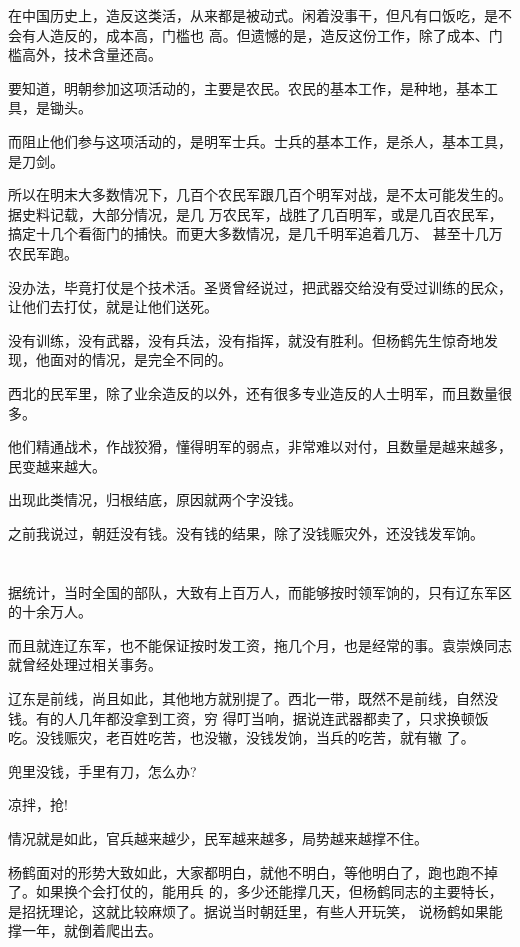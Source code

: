 \documentclass[11pt,a4paper,onecolumn]{article}
\begin{document}
在中国历史上，造反这类活，从来都是被动式。闲着没事干，但凡有口饭吃，是不会有人造反的，成本高，门槛也
高。但遗憾的是，造反这份工作，除了成本、门槛高外，技术含量还高。

要知道，明朝参加这项活动的，主要是农民。农民的基本工作，是种地，基本工具，是锄头。

而阻止他们参与这项活动的，是明军士兵。士兵的基本工作，是杀人，基本工具，是刀剑。

所以在明末大多数情况下，几百个农民军跟几百个明军对战，是不太可能发生的。据史料记载，大部分情况，是几
万农民军，战胜了几百明军，或是几百农民军，搞定十几个看衙门的捕快。而更大多数情况，是几千明军追着几万、
甚至十几万农民军跑。

没办法，毕竟打仗是个技术活。圣贤曾经说过，把武器交给没有受过训练的民众，让他们去打仗，就是让他们送死。

没有训练，没有武器，没有兵法，没有指挥，就没有胜利。但杨鹤先生惊奇地发现，他面对的情况，是完全不同的。

西北的民军里，除了业余造反的以外，还有很多专业造反的人士\myrule 明军，而且数量很多。

他们精通战术，作战狡猾，懂得明军的弱点，非常难以对付，且数量是越来越多，民变越来越大。

出现此类情况，归根结底，原因就两个字\myrule 没钱。

之前我说过，朝廷没有钱。没有钱的结果，除了没钱赈灾外，还没钱发军饷。

\section[\thesection]{}

据统计，当时全国的部队，大致有上百万人，而能够按时领军饷的，只有辽东军区的十余万人。

而且就连辽东军，也不能保证按时发工资，拖几个月，也是经常的事。袁崇焕同志就曾经处理过相关事务。

辽东是前线，尚且如此，其他地方就别提了。西北一带，既然不是前线，自然没钱。有的人几年都没拿到工资，穷
得叮当响，据说连武器都卖了，只求换顿饭吃。没钱赈灾，老百姓吃苦，也没辙，没钱发饷，当兵的吃苦，就有辙
了。

兜里没钱，手里有刀，怎么办?

凉拌，抢!

情况就是如此，官兵越来越少，民军越来越多，局势越来越撑不住。

杨鹤面对的形势大致如此，大家都明白，就他不明白，等他明白了，跑也跑不掉了。如果换个会打仗的，能用兵
的，多少还能撑几天，但杨鹤同志的主要特长，是招抚理论，这就比较麻烦了。据说当时朝廷里，有些人开玩笑，
说杨鹤如果能撑一年，就倒着爬出去。
\end{document}
